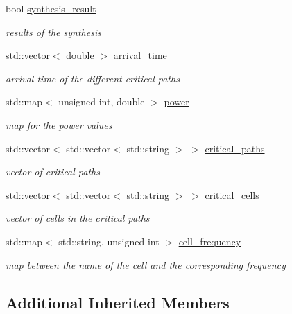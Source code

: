 \begin{DoxyCompactItemize}
bool \hyperlink{classDesignCompilerWrapper_a798f2d4fc66dd935cfc7c118c3067392}{synthesis\+\_\+result}
\begin{DoxyCompactList}\small\item\em results of the synthesis \end{DoxyCompactList}\item 
std\+::vector$<$ double $>$ \hyperlink{classDesignCompilerWrapper_af699c3910eb8a7a2beb2c9c20af83d2d}{arrival\+\_\+time}
\begin{DoxyCompactList}\small\item\em arrival time of the different critical paths \end{DoxyCompactList}\item 
std\+::map$<$ unsigned int, double $>$ \hyperlink{classDesignCompilerWrapper_ad6ccfbedbee6b2b4399b47a6e4e19de7}{power}
\begin{DoxyCompactList}\small\item\em map for the power values \end{DoxyCompactList}\item 
std\+::vector$<$ std\+::vector$<$ std\+::string $>$ $>$ \hyperlink{classDesignCompilerWrapper_aa27eec3667b5f84ae2b95ebcd13d4e32}{critical\+\_\+paths}
\begin{DoxyCompactList}\small\item\em vector of critical paths \end{DoxyCompactList}\item 
std\+::vector$<$ std\+::vector$<$ std\+::string $>$ $>$ \hyperlink{classDesignCompilerWrapper_a3d84353310f895bec66d2253be0e26ea}{critical\+\_\+cells}
\begin{DoxyCompactList}\small\item\em vector of cells in the critical paths \end{DoxyCompactList}\item 
std\+::map$<$ std\+::string, unsigned int $>$ \hyperlink{classDesignCompilerWrapper_a7f00337678d6a6aec9c71dec04c10bb7}{cell\+\_\+frequency}
\begin{DoxyCompactList}\small\item\em map between the name of the cell and the corresponding frequency \end{DoxyCompactList}\end{DoxyCompactItemize}
\subsection*{Additional Inherited Members}


